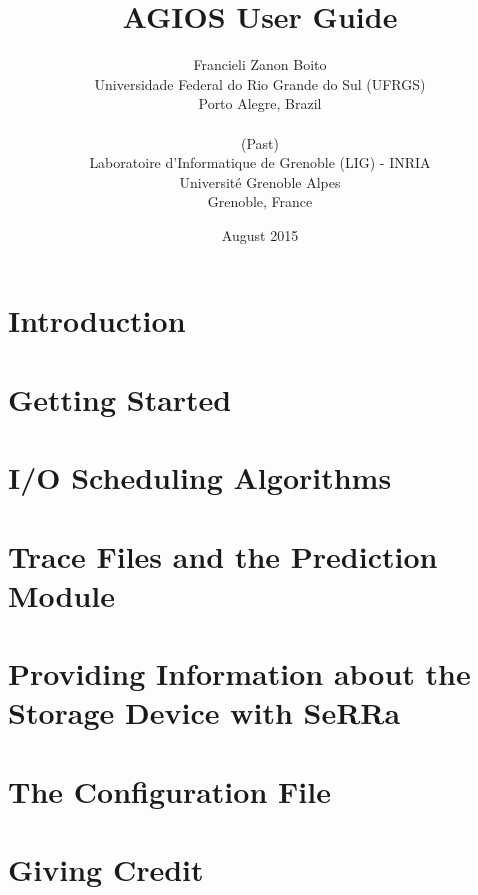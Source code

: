 \documentclass[10pt]{report}
\begin{document}
%
\title{AGIOS User Guide}


\author{
Francieli Zanon Boito\\Universidade Federal do Rio Grande do Sul (UFRGS)\\Porto Alegre, Brazil\\\\(Past)\\Laboratoire d'Informatique de Grenoble (LIG) - INRIA\\Universit\'{e} Grenoble Alpes\\Grenoble, France}

\date{August 2015}

\maketitle

\tableofcontents


\chapter{Introduction}



\chapter{Getting Started} \label{chapter:starting}



\chapter{I/O Scheduling Algorithms} \label{chapter:algorithms}



\chapter{Trace Files and the Prediction Module} \label{chapter:trace}



\chapter{Providing Information about the Storage Device with SeRRa} \label{chapter:serra}



\chapter{The Configuration File} \label{chapter:configfile}



\chapter{Giving Credit} \label{chapter:citing}




\balance
%
%

\end{document}
